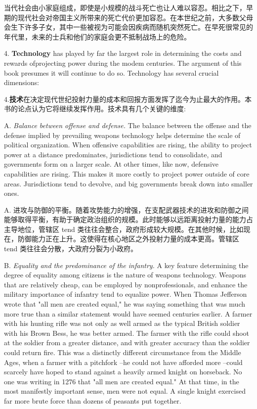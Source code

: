 \begin{Parallel}{97mm}{45mm}
  \ParallelRText
  {当代社会由小家庭组成，即使是小规模的战斗死亡也让人难以容忍。相比之下，早期的现代社会对帝国主义所带来的死亡代价更加容忍。在本世纪之前，大多数父母会生下许多子女，其中一些被视为可能会因疾病而随机突然死亡。在早死很常见的年代里，未来的士兵和他们的家庭会更不抵制战场上的危险。
  }
  \ParallelPar


  \ParallelLText
  {4. \textbf{Technology} has played by far the largest role in determining the costs and rewards ofprojecting power during the modem centuries. The argument of this book presumes it will continue to do so. Technology has several crucial dimensions: }
  
  \ParallelRText
  {4.\textbf{技术}在决定现代世纪投射力量的成本和回报方面发挥了迄今为止最大的作用。本书的论点认为它将继续发挥作用。技术具有几个关键的维度:}
  \ParallelPar



  \ParallelLText
  {A. \emph{Balance between offense and defense.} The balance between the offense and the defense implied by prevailing weapons technology helps determine the scale of political organization. When offensive capabilities are rising, the ability to project power at a distance predominates, jurisdictions tend to consolidate, and governments form on a larger scale. At other times, like now, defensive capabilities are rising. This makes it more costly to project power outside of core areas. Jurisdictions tend to devolve, and big governments break down into smaller ones. }
  
  \ParallelRText
  {A. 进攻与防御的平衡。随着攻势能力的增强，在支配武器技术的进攻和防御之间能够取得平衡，有助于确定政治组织的规模。此时能够以远距离投射力量的能力占主导地位，管辖区 tend 类往往会整合，政府形成较大规模。在其他时候，比如现在，防御能力正在上升。这使得在核心地区之外投射力量的成本更高。管辖区 tend 类往往会分散，大政府分裂为小政府。}
  \ParallelPar


  \ParallelLText
  {B. \emph{Equality and the predominance of the infantry.} A key feature determining the degree of equality among citizens is the nature of weapons technology. Weapons that are relatively cheap, can be employed by nonprofessionals, and enhance the military importance of infantry tend to equalize power. When Thomas Jefferson wrote that "all men are created equal," he was saying something that was much more true than a similar statement would have seemed centuries earlier. A farmer with his hunting rifle was not only as well armed as the typical British soldier with his Brown Bess, he was better armed. The farmer with the rifle could shoot at the soldier from a greater distance, and with greater accuracy than the soldier could return fire. This was a distinctly different circumstance from the Middle Ages, when a farmer with a pitchfork --he could not have afforded more --could scarcely have hoped to stand against a heavily armed knight on horseback. No one was writing in 1276 that "all men are created equal." At that time, in the most manifestly important sense, men were not equal. A single knight exercised far more brute force than dozens of peasants put together.}
  

\end{Parallel}
